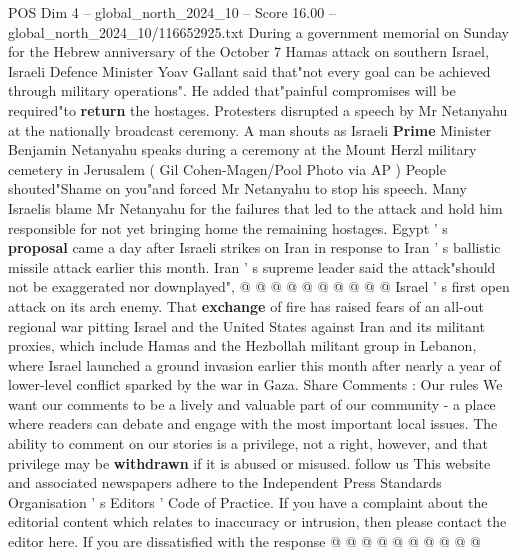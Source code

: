 \begin{textsample}{POS Dim 4 – global\_north\_2024\_10 – Score 16.00 – global\_north\_2024\_10/116652925.txt}
During a government memorial on Sunday for the Hebrew anniversary of the October 7 Hamas attack on southern Israel, Israeli Defence Minister Yoav Gallant said that"not every goal can be achieved through military operations".
He added that"painful compromises will be required"to \textbf{return} the hostages.
Protesters disrupted a speech by Mr Netanyahu at the nationally broadcast ceremony.
A man shouts as Israeli \textbf{Prime} Minister Benjamin Netanyahu speaks during a ceremony at the Mount Herzl military cemetery in Jerusalem ( Gil Cohen-Magen/Pool Photo via AP ) People shouted"Shame on you"and forced Mr Netanyahu to stop his speech.
Many Israelis blame Mr Netanyahu for the failures that led to the attack and hold him responsible for not yet bringing home the remaining hostages.
Egypt ' s \textbf{proposal} came a day after Israeli strikes on Iran in response to Iran ' s ballistic missile attack earlier this month.
Iran ' s supreme leader said the attack"should not be exaggerated nor downplayed", @ @ @ @ @ @ @ @ @ @ Israel ' s first open attack on its arch enemy.
That \textbf{exchange} of fire has raised fears of an all-out regional war pitting Israel and the United States against Iran and its militant proxies, which include Hamas and the Hezbollah militant group in Lebanon, where Israel launched a ground invasion earlier this month after nearly a year of lower-level conflict sparked by the war in Gaza.
Share Comments : Our rules We want our comments to be a lively and valuable part of our community - a place where readers can debate and engage with the most important local issues.
The ability to comment on our stories is a privilege, not a right, however, and that privilege may be \textbf{withdrawn} if it is abused or misused. follow us This website and associated newspapers adhere to the Independent Press Standards Organisation ' s Editors ' Code of Practice.
If you have a complaint about the editorial content which relates to inaccuracy or intrusion, then please contact the editor here.
If you are dissatisfied with the response @ @ @ @ @ @ @ @ @ @

\end{textsample}
